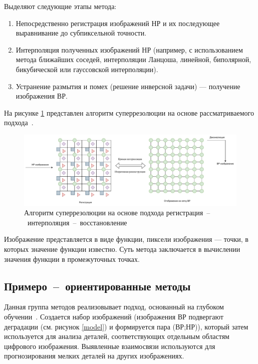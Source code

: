 Выделяют следующие этапы метода:

\begin{enumerate}
    \item Непосредственно регистрация изображений НР и их последующее выравнивание до субпиксельной точности. 
    \item Интерполяция полученных изображений НР (например, с использованием метода ближайших соседей, интерполяции Ланцоша, линейной, биполярной, бикубической или гауссовской интерполяции).
    \item Устранение размытия и помех (решение инверсной задачи) --- получение изображения ВР.
\end{enumerate}

На рисунке \ref{fig:interpolation} представлен алгоритм суперрезолюции на основе рассматриваемого подхода~\cite{p}.

\begin{figure}[H]
	\centering
	\includegraphics[scale=0.55]{assets/inerpolation.pdf}
	\caption{Алгоритм суперрезолюции на основе подхода регистрация~--~интерполяция~--~восстановление}
	\label{fig:interpolation}
\end{figure}

Изображение представляется в виде функции, пиксели изображения --- точки, в которых значение функции известно. Суть метода заключается в вычислении значения функции в промежуточных точках.

\subsection{Примеро~--~ориентированные методы}

Данная группа методов реализовывает подход, основанный на глубоком обучении~\cite{patch}. Создается набор изображений (изображения ВР подвергают деградации (см. рисунок \ref{model}) и формируется пара (ВР;НР)), который затем используется для анализа деталей, соответствующих отдельным областям цифрового изображения. Выявленные взаимосвязи используются для прогнозирования мелких деталей на других изображениях.

